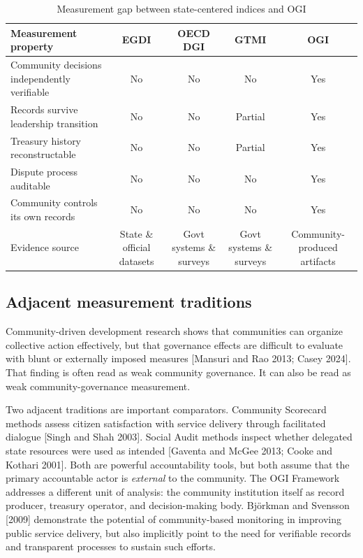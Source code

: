 \documentclass[sigconf,anonymous]{acmart}
\begin{document}
\begin{table}[t]
\caption{Measurement gap between state-centered indices and OGI}
\label{tab:gap}
\small
\begin{tabularx}{\textwidth}{Ycccc}
\toprule
Measurement property & EGDI & OECD DGI & GTMI & OGI \\
\midrule
Community decisions independently verifiable & No & No & No & Yes \\
Records survive leadership transition        & No & No & Partial & Yes \\
Treasury history reconstructable             & No & No & Partial & Yes \\
Dispute process auditable                    & No & No & No & Yes \\
Community controls its own records           & No & No & No & Yes \\
Evidence source & State \& official datasets & Govt systems \& surveys & Govt systems \& surveys & Community-produced artifacts \\
\bottomrule
\end{tabularx}
\end{table}

\subsection{Adjacent measurement traditions}

Community-driven development research shows that communities can organize collective action effectively, but that governance effects are difficult to evaluate with blunt or externally imposed measures [Mansuri and Rao 2013; Casey 2024]. That finding is often read as weak community governance. It can also be read as weak community-governance measurement.

Two adjacent traditions are important comparators. Community Scorecard methods assess citizen satisfaction with service delivery through facilitated dialogue [Singh and Shah 2003]. Social Audit methods inspect whether delegated state resources were used as intended [Gaventa and McGee 2013; Cooke and Kothari 2001]. Both are powerful accountability tools, but both assume that the primary accountable actor is \emph{external} to the community. The OGI Framework addresses a different unit of analysis: the community institution itself as record producer, treasury operator, and decision-making body. Björkman and Svensson [2009] demonstrate the potential of community-based monitoring in improving public service delivery, but also implicitly point to the need for verifiable records and transparent processes to sustain such efforts.
\end{document}
